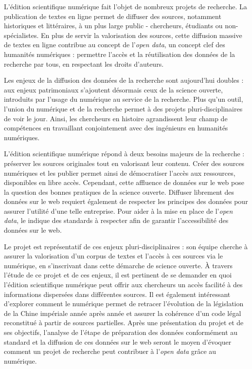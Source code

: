 L'édition scientifique numérique fait l'objet de nombreux projets de recherche. La publication de textes en ligne permet de diffuser des sources, notamment historiques et littéraires, à un plus large public - chercheurs, étudiants ou non-spécialistes. En plus de servir la valorisation des sources, cette diffusion massive de textes en ligne contribue au concept de l'\textit{open data}, un concept clef des humanités numériques : permettre l'accès et la réutilisation des données de la recherche par tous, en respectant les droits d'auteurs. 

Les enjeux de la diffusion des données de la recherche sont aujourd'hui doubles : aux enjeux patrimoniaux s'ajoutent désormais ceux de la science ouverte, introduits par l'usage du numérique au service de la recherche. Plus qu'un outil, l'union du numérique et de la recherche permet à des projets pluri-disciplinaires de voir le jour. Ainsi, les chercheurs en histoire agrandissent leur champ de compétences en travaillant conjointement avec des ingénieurs en humanités numériques. 

L'édition scientifique numérique répond à deux besoins majeurs de la recherche : préserver les sources originales tout en valorisant leur contenu. Créer des sources numériques et les publier permet ainsi de démocratiser l'accès aux ressources, disponibles en libre accès. Cependant, cette affluence de données sur le web pose la question des \og bonnes pratiques \fg de la science ouverte. Diffuser librement des données sur le web requiert également de respecter les principes \fair des données pour assurer l'utilité d'une telle entreprise. Pour aider à la mise en place de l'\textit{open data}, le \w indique des standards à respecter afin de garantir l'accessibilité des données sur le web. 

Le projet \COREL est représentatif de ces enjeux pluri-disciplinaires : son équipe cherche à assurer la valorisation d'un corpus de textes et l'accès à ces sources via le numérique, en s'inscrivant dans cette démarche de science ouverte. À travers l'étude de ce projet et de ces enjeux, il est pertinent de se demander en quoi l’édition scientifique numérique peut offrir aux chercheurs un accès facilité à des informations dispersées dans différentes sources. Il est également intéressant d'explorer comment le numérique permet de retracer l’évolution de la législation de la Chine impériale année après année et assurer la cohérence d’un code légal reconstitué à partir de sources partielles. Après une présentation du projet et de ses objectifs, l'analyse de l'étape de préparation des données conformément au standard \TEI et la diffusion de ces données sur le web seront le moyen d'évoquer comment un projet de recherche peut contribuer à l'\textit{open data} grâce au numérique.